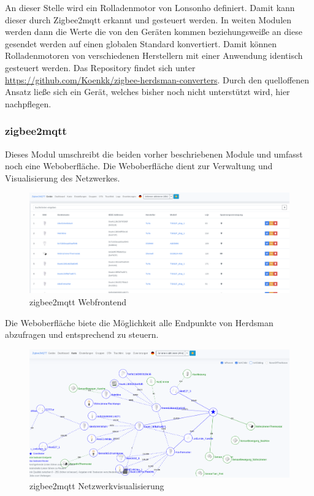   An dieser Stelle wird ein Rolladenmotor von Lonsonho definiert. Damit kann dieser durch Zigbee2mqtt erkannt und gesteuert werden. In weiten Modulen werden dann die Werte die von den Geräten kommen
  beziehungsweiße an diese gesendet werden auf einen globalen Standard konvertiert. Damit können Rolladenmotoren von verschiedenen Herstellern mit einer Anwendung identisch gesteuert werden. Das 
  Repository findet sich unter \url{https://github.com/Koenkk/zigbee-herdsman-converters}. Durch den quelloffenen Ansatz ließe sich ein Gerät, welches bisher noch nicht unterstützt wird, hier nachpflegen.

\subsubsection{zigbee2mqtt}

Dieses Modul umschreibt die beiden vorher beschriebenen Module und umfasst noch eine Weboberfläche. Die Weboberfläche dient zur Verwaltung und Visualisierung des Netzwerkes.
\begin{figure}[H]
  \centering
  \includegraphics[width=1\textwidth]{media/z2m.png}
  \caption{zigbee2mqtt Webfrontend}
\end{figure}

Die Weboberfläche biete die Möglichkeit alle Endpunkte von Herdsman abzufragen und entsprechend zu steuern.

\begin{figure}[H]
  \centering
  \includegraphics[width=1\textwidth]{media/z2m-map.png}
  \caption{zigbee2mqtt Netzwerkvisualisierung}
\end{figure}

